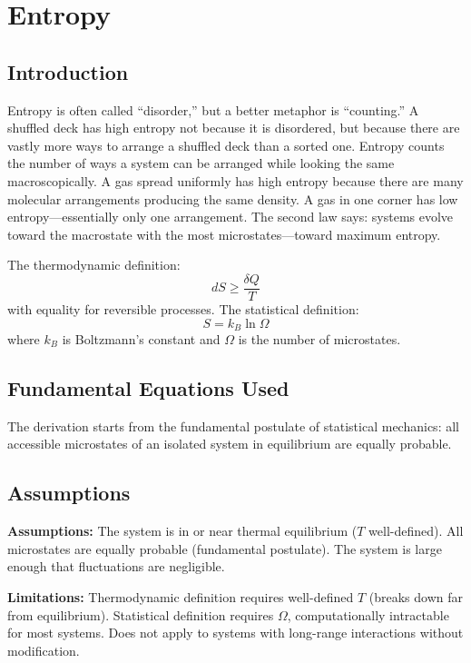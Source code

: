 \chapter{Entropy}

\section*{Introduction}

Entropy is often called ``disorder,'' but a better metaphor is ``counting.'' A shuffled deck has high entropy not because it is disordered, but because there are vastly more ways to arrange a shuffled deck than a sorted one. Entropy counts the number of ways a system can be arranged while looking the same macroscopically. A gas spread uniformly has high entropy because there are many molecular arrangements producing the same density. A gas in one corner has low entropy---essentially only one arrangement. The second law says: systems evolve toward the macrostate with the most microstates---toward maximum entropy.


The thermodynamic definition:
\[
dS \geq \frac{\delta Q}{T}
\]
with equality for reversible processes. The statistical definition:
\[
S = k_B \ln \Omega
\]
where $k_B$ is Boltzmann's constant and $\Omega$ is the number of microstates.

\section*{Fundamental Equations Used}

The derivation starts from the fundamental postulate of statistical mechanics: all accessible microstates of an isolated system in equilibrium are equally probable.

\section*{Assumptions}

\textbf{Assumptions:} The system is in or near thermal equilibrium ($T$ well-defined). All microstates are equally probable (fundamental postulate). The system is large enough that fluctuations are negligible.


\textbf{Limitations:} Thermodynamic definition requires well-defined $T$ (breaks down far from equilibrium). Statistical definition requires $\Omega$, computationally intractable for most systems. Does not apply to systems with long-range interactions without modification.


